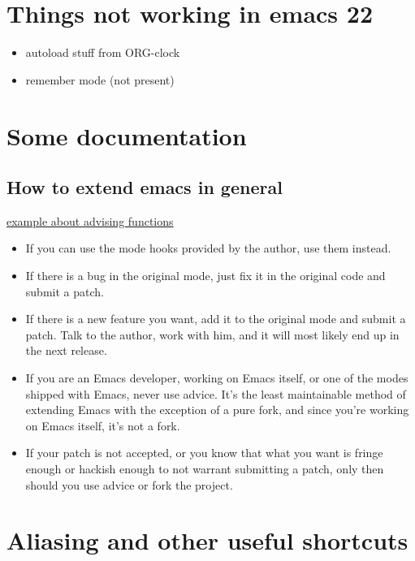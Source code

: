 \documentclass[11pt]{article}
\begin{document}
\section{Things not working in emacs 22}
\label{sec-13}

\begin{itemize}
\item autoload stuff from ORG-clock
\item remember mode (not present)
\end{itemize}
\section{Some documentation}
\label{sec-14}
\subsection{How to extend emacs in general}
\label{sec-14.1}

   \href{http://www.enigmacurry.com/2009/01/14/extending-emacs-with-advice/}{example about advising functions}
\begin{itemize}
\item If you can use the mode hooks provided by the author, use them instead.
\item If there is a bug in the original mode, just fix it in the original code and submit a patch.
\item If there is a new feature you want, add it to the original mode and submit a patch. Talk to the author, work with him, and it will most likely end up in the next release.
\item If you are an Emacs developer, working on Emacs itself, or one of the modes shipped with Emacs, never use advice. It's the least maintainable method of extending Emacs with the exception of a pure fork, and since you're working on Emacs itself, it's not a fork.
\item If your patch is not accepted, or you know that what you want is fringe enough or hackish enough to not warrant submitting a patch, only then should you use advice or fork the project.
\end{itemize}
   
\section{Aliasing and other useful shortcuts}
\label{sec-15}
\end{document}
